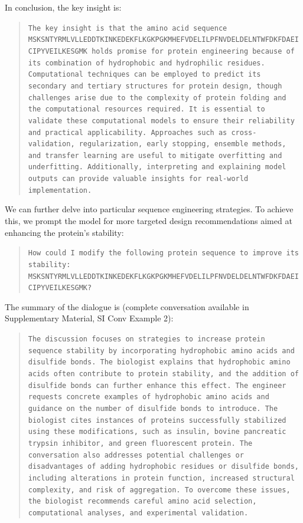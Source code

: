 In conclusion, the key insight is:

\begin{quote}
\small\texttt{The key insight is that the amino acid sequence MSKSNTYRMLVLLEDDTKINKEDEKFLKGKPGKMHEFVDELILPFNVDELDELNTWFDKFDAEICIPYVEILKESGMK holds promise for protein engineering because of its combination of hydrophobic and hydrophilic residues. Computational techniques can be employed to predict its secondary and tertiary structures for protein design, though challenges arise due to the complexity of protein folding and the computational resources required. It is essential to validate these computational models to ensure their reliability and practical applicability. Approaches such as cross-validation, regularization, early stopping, ensemble methods, and transfer learning are useful to mitigate overfitting and underfitting. Additionally, interpreting and explaining model outputs can provide valuable insights for real-world implementation.}
\end{quote}

We can further delve into particular sequence engineering strategies. To achieve this, we prompt the model for more targeted design recommendations aimed at enhancing the protein’s stability:

\begin{quote}
\small\texttt{How could I modify the following protein sequence to improve its stability: MSKSNTYRMLVLLEDDTKINKEDEKFLKGKPGKMHEFVDELILPFNVDELDELNTWFDKFDAEICIPYVEILKESGMK? }
\end{quote}

The summary of the dialogue is (complete conversation available in Supplementary Material, SI Conv Example 2):

\begin{quote}
\small\texttt{The discussion focuses on strategies to increase protein sequence stability by incorporating hydrophobic amino acids and disulfide bonds. The biologist explains that hydrophobic amino acids often contribute to protein stability, and the addition of disulfide bonds can further enhance this effect. The engineer requests concrete examples of hydrophobic amino acids and guidance on the number of disulfide bonds to introduce. The biologist cites instances of proteins successfully stabilized using these modifications, such as insulin, bovine pancreatic trypsin inhibitor, and green fluorescent protein. The conversation also addresses potential challenges or disadvantages of adding hydrophobic residues or disulfide bonds, including alterations in protein function, increased structural complexity, and risk of aggregation. To overcome these issues, the biologist recommends careful amino acid selection, computational analyses, and experimental validation.}
\end{quote}

